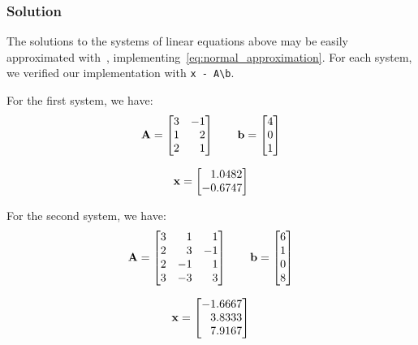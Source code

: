 \subsubsection*{Solution}
The solutions to the systems of linear equations above may be easily approximated
with~, implementing~\eqref{eq:normal_approximation}.
For each system, we verified our implementation with
\lstinline[style=Matlab-editor]{x - A\b}.

For the first system, we have:
\begin{equation*}
  \mathbf{A} = \begin{bmatrix}
    3 & -1 \\
    1 & \phantom{-}2 \\
    2 & \phantom{-}1
  \end{bmatrix} \qquad
  \mathbf{b} = \begin{bmatrix}
    4 \\
    0 \\
    1
  \end{bmatrix}
\end{equation*}

\begin{equation*}
  \mathbf{x} = \begin{bmatrix}
    \phantom{-}1.0482 \\
    -0.6747
  \end{bmatrix}
\end{equation*}

For the second system, we have:
\begin{equation*}
  \mathbf{A} = \begin{bmatrix}
    3 & \phantom{-}1 & \phantom{-}1 \\
    2 & \phantom{-}3 & -1 \\
    2 & -1 & \phantom{-}1 \\
    3 & -3 & \phantom{-}3
  \end{bmatrix} \qquad
  \mathbf{b} = \begin{bmatrix}
    6 \\
    1 \\
    0 \\
    8
  \end{bmatrix}
\end{equation*}

\begin{equation*}
  \mathbf{x} = \begin{bmatrix}
    -1.6667 \\
    \phantom{-}3.8333 \\
    \phantom{-}7.9167
  \end{bmatrix}
\end{equation*}

